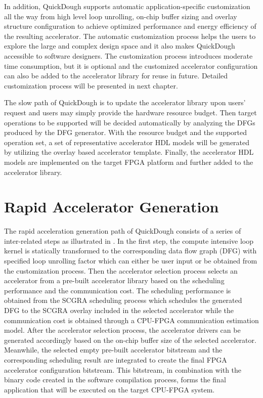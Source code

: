 In addition, QuickDough supports automatic application-specific customization all the way from high level loop unrolling, on-chip buffer sizing and overlay structure configuration to achieve optimized performance and energy efficiency of the resulting accelerator. The automatic customization process helps the users to explore the large and complex design space and it also makes QuickDough accessible to software designers. The customization process introduces moderate time consumption, but it is optional and the customized accelerator configuration can also be added to the accelerator library for reuse in future. Detailed customization process will be presented in next chapter.

The slow path of QuickDough is to update the accelerator library upon users' request and users may simply provide the hardware resource budget. Then target operations to be supported will be decided automatically by analyzing the DFGs produced by the DFG generator. With the resource budget and the supported operation set, a set of representative accelerator HDL models will be generated by utilizing the overlay based accelerator template. Finally, the accelerator HDL models are implemented on the target FPGA platform and further added to the accelerator library.

\section{Rapid Accelerator Generation} \label{sec:loop-compilation}
The rapid acceleration generation path of QuickDough consists of a series of inter-related steps as illustrated in . In the first step, the compute intensive loop kernel is statically transformed to the corresponding data flow graph (DFG) with specified loop unrolling factor which can either be user input or be obtained from the customization process. Then the accelerator selection process selects an accelerator from a pre-built accelerator library based on the scheduling performance and the communication cost. The scheduling performance is obtained from the SCGRA scheduling process which schedules the generated DFG to the SCGRA overlay included in the selected accelerator while the communication cost is obtained through a CPU-FPGA communication estimation model. After the accelerator selection process, the accelerator drivers can be generated accordingly based on the on-chip buffer size of the selected accelerator. Meanwhile, the selected empty pre-built accelerator bitstream and the corresponding scheduling result are integrated to create the final FPGA accelerator configuration bitstream. This bitstream, in combination with the binary code created in the software compilation process, forms the final application that will be executed on the target CPU-FPGA system.

